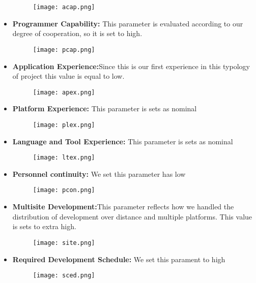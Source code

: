 \documentclass[12pt, oneside]{book}   	%
\begin{document}
\begin{itemize}
\begin{figure}[h]
\centering
\texttt{[image: acap.png]}
\end{figure}
\item \textbf{Programmer Capability:} This parameter is evaluated according to our degree of cooperation, so it is set to high.
\begin{figure}[h]
\centering
\texttt{[image: pcap.png]}
\end{figure}
\clearpage
\item \textbf{Application Experience:}Since this is our first experience in this typology of project this value is equal to low.
\begin{figure}[h]
\centering
\texttt{[image: apex.png]}
\end{figure}
\item \textbf{Platform Experience:} This parameter is sets as nominal
\begin{figure}[h]
\centering
\texttt{[image: plex.png]}
\end{figure}
\item \textbf{Language and Tool Experience:} This parameter is sets as nominal
\begin{figure}[h]
\centering
\texttt{[image: ltex.png]}
\end{figure}
\clearpage
\item \textbf{Personnel continuity:} We set this parameter has low 
\begin{figure}[h]
\centering
\texttt{[image: pcon.png]}
\end{figure}
\item \textbf{Multisite Development:}This parameter reflects how we handled the distribution of development over distance and multiple platforms. This value is sets to extra high.
\begin{figure}[h]
\centering
\texttt{[image: site.png]}
\end{figure}
\item \textbf{Required Development Schedule:} We set this parament to high
\begin{figure}[h]
\centering
\texttt{[image: sced.png]}
\end{figure}
\end{itemize}
\clearpage
\end{document}
